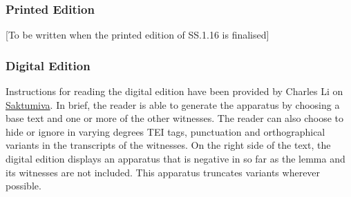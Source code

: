 \subsubsection{Printed Edition}
[To be written when the printed edition of SS.1.16 is finalised]

\subsubsection{Digital Edition}
Instructions for reading the digital edition have been provided by Charles Li on \href{https://saktumiva.org/wiki/users}{Saktumiva}. In brief, the reader is able to generate the apparatus by choosing a base text and one or more of the other witnesses. The reader can also choose to hide or ignore in varying degrees TEI tags, punctuation and orthographical variants in the transcripts of the witnesses. On the right side of the text, the digital edition displays an apparatus that is negative in so far as the lemma and its witnesses are not included. This apparatus truncates variants wherever possible. 

